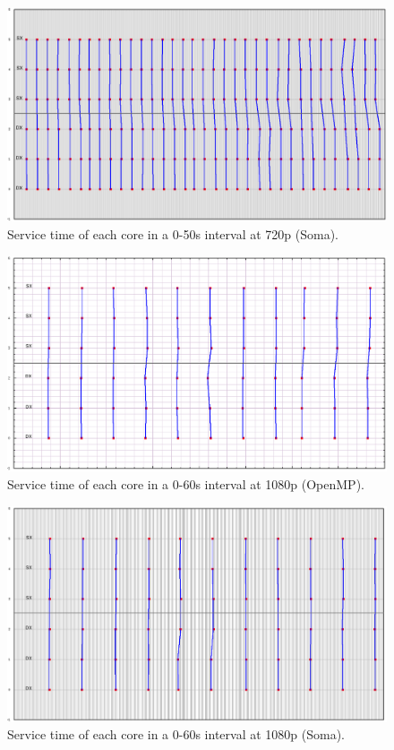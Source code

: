 \documentclass[a4paper,12pt,oneside]{book}
\begin{document}
\begin{figure}[H]
\centering
\includegraphics[scale=0.27]{soma_720_range_050.png}
\caption{Service time of each core in a 0-50s interval at 720p (Soma).}
\label{soma720jitter}
\end{figure}

\begin{figure}[H]
\centering
\includegraphics[scale=0.27]{omp_1080_range_040.png}
\caption{Service time of each core in a 0-60s interval at 1080p (OpenMP).}
\label{omp1080jitter}
\end{figure}

\begin{figure}[H]
\centering
\includegraphics[scale=0.27]{soma_1080_range_040.png}
\caption{Service time of each core in a 0-60s interval at 1080p (Soma).}
\label{soma1080jitter}
\end{figure}
\end{document}

